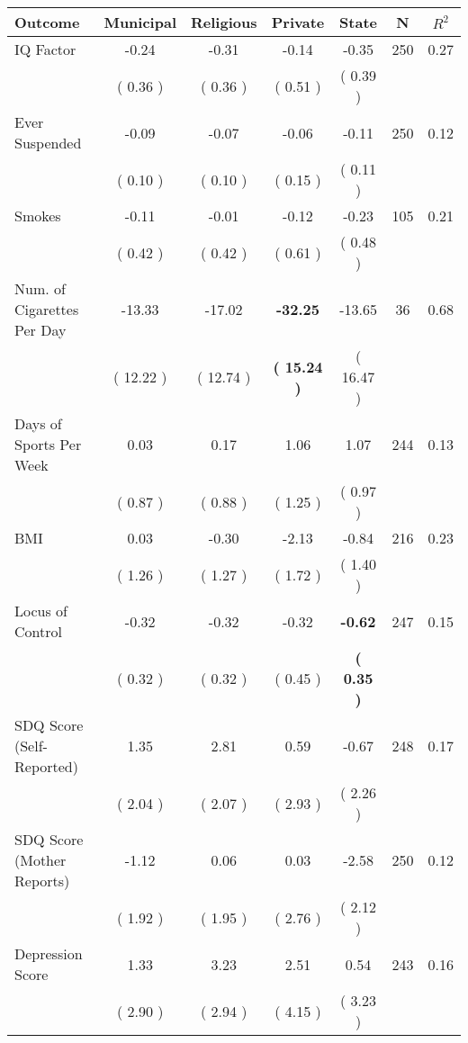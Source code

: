 \begin{tabular}{lcccccc}
\toprule
 \textbf{Outcome} & \textbf{Municipal} & \textbf{Religious} & \textbf{Private} & \textbf{State} & \textbf{N} & \textbf{$ R^2$} \\
\midrule
IQ Factor &     -0.24 &     -0.31 &     -0.14 &     -0.35 & 250 &      0.27 \\ 
 & (     0.36 ) & (     0.36 ) & (     0.51 ) & (     0.39 ) & \\
Ever Suspended &     -0.09 &     -0.07 &     -0.06 &     -0.11 & 250 &      0.12 \\ 
 & (     0.10 ) & (     0.10 ) & (     0.15 ) & (     0.11 ) & \\
Smokes &     -0.11 &     -0.01 &     -0.12 &     -0.23 & 105 &      0.21 \\ 
 & (     0.42 ) & (     0.42 ) & (     0.61 ) & (     0.48 ) & \\
Num. of Cigarettes Per Day &    -13.33 &    -17.02 & \textbf{   -32.25} &    -13.65 & 36 &      0.68 \\ 
 & (    12.22 ) & (    12.74 ) & \textbf{(    15.24 )} & (    16.47 ) & \\
Days of Sports Per Week &      0.03 &      0.17 &      1.06 &      1.07 & 244 &      0.13 \\ 
 & (     0.87 ) & (     0.88 ) & (     1.25 ) & (     0.97 ) & \\
BMI &      0.03 &     -0.30 &     -2.13 &     -0.84 & 216 &      0.23 \\ 
 & (     1.26 ) & (     1.27 ) & (     1.72 ) & (     1.40 ) & \\
Locus of Control &     -0.32 &     -0.32 &     -0.32 & \textbf{    -0.62} & 247 &      0.15 \\ 
 & (     0.32 ) & (     0.32 ) & (     0.45 ) & \textbf{(     0.35 )} & \\
SDQ Score (Self-Reported) &      1.35 &      2.81 &      0.59 &     -0.67 & 248 &      0.17 \\ 
 & (     2.04 ) & (     2.07 ) & (     2.93 ) & (     2.26 ) & \\
SDQ Score (Mother Reports) &     -1.12 &      0.06 &      0.03 &     -2.58 & 250 &      0.12 \\ 
 & (     1.92 ) & (     1.95 ) & (     2.76 ) & (     2.12 ) & \\
Depression Score &      1.33 &      3.23 &      2.51 &      0.54 & 243 &      0.16 \\ 
 & (     2.90 ) & (     2.94 ) & (     4.15 ) & (     3.23 ) & \\
\bottomrule
\end{tabular}
